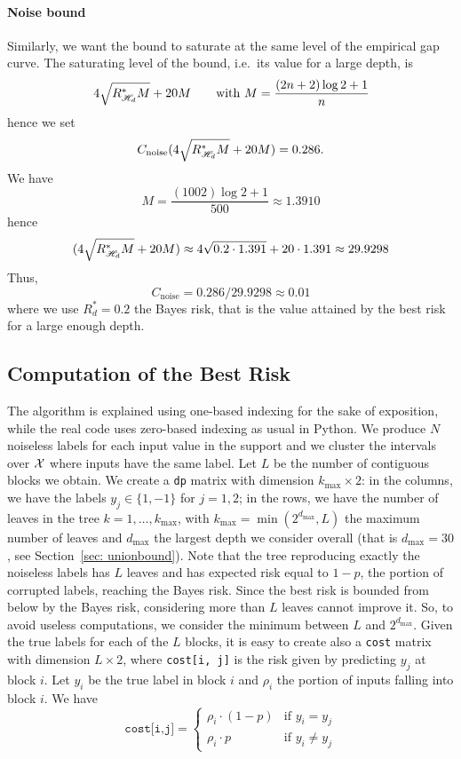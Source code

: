 \paragraph{Noise bound} Similarly, we want the bound to saturate at the same level of the empirical gap curve. The saturating level of the bound, i.e.\ its value for a large depth, is 
\[
4\sqrt{R^*_{\mathscr{H}_d}M} + 20M \qquad \text{with }M = \frac{(2n+2)\log 2+1}{n}
\]
hence we set
\[
C_{\text{noise}} (4\sqrt{R^*_{\mathscr{H}_d}M} + 20M) = 0.286.
\]
We have 
\[
M = \frac{(1002)\log 2+1}{500} \approx 1.3910
\]
hence 
\[
(4\sqrt{R^*_{\mathscr{H}_d}M} + 20M) \approx 4 \sqrt{0.2\cdot 1.391} + 20\cdot 1.391 \approx 29.9298
\]
Thus,
\[
C_{\text{noise}} = 0.286 / 29.9298 \approx 0.01
\]
where we use $R^*_d = 0.2$ the Bayes risk, that is the value attained by the best risk for a large enough depth. 

\subsection{Computation of the Best Risk}\label{app: bestrisk} The algorithm is explained using one-based indexing for the sake of exposition, while the real code uses zero-based indexing as usual in Python. We produce $N$ noiseless labels for each input value in the support and we cluster the intervals over $\mathcal{X}$ where inputs have the same label. Let $L$ be the number of contiguous blocks we obtain. We create a \texttt{dp} matrix with dimension $k_{\max} \times 2$: in the columns, we have the labels $y_j \in\{1,-1\}$ for $j = 1,2$; in the rows, we have the number of leaves in the tree $k = 1,\ldots,k_{\max}$, with $k_{\max} = \min(2^{d_{\max}}, L)$ the maximum number of leaves and $d_{\max}$ the largest depth we consider overall (that is $d_{\max}=30$, see Section~\ref{sec: unionbound}). Note that the tree reproducing exactly the noiseless labels has $L$ leaves and has expected risk equal to $1-p$, the portion of corrupted labels, reaching the Bayes risk. Since the best risk is bounded from below by the Bayes risk, considering more than $L$ leaves cannot improve it. So, to avoid useless computations, we consider the minimum between $L$ and $2^{d_{\max}}$. Given the true labels for each of the $L$ blocks, it is easy to create also a \texttt{cost} matrix with dimension $L\times 2$, where \texttt{cost[i, j]} is the risk given by predicting  $y_j$ at block $i$. Let $y_i$ be the true label in block $i$ and $\rho_i$ the portion of inputs falling into block $i$. We have 
\[
\texttt{cost[i,j]} = \begin{cases}
    \rho_i \cdot (1-p) & \text{if } y_i = y_j\\
    \rho_i \cdot p & \text{if } y_i \neq y_j
\end{cases}
\]


